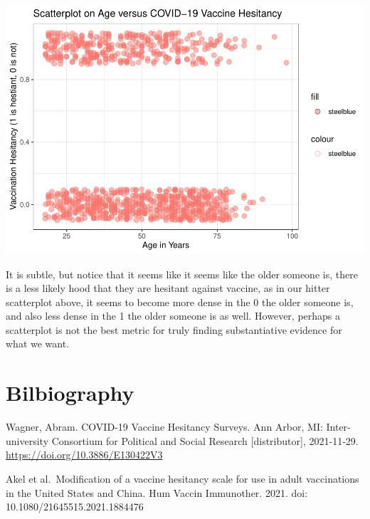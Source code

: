 \documentclass[
]{article}
\begin{document}
\includegraphics{final_project_part2_files/figure-latex/unnamed-chunk-4-1.pdf}

It is subtle, but notice that it seems like it seems like the older
someone is, there is a less likely hood that they are hesitant against
vaccine, as in our hitter scatterplot above, it seems to become more
dense in the 0 the older someone is, and also less dense in the 1 the
older someone is as well. However, perhaps a scatterplot is not the best
metric for truly finding substantiative evidence for what we want.

\hypertarget{bilbiography}{%
\section{Bilbiography}\label{bilbiography}}

Wagner, Abram. COVID-19 Vaccine Hesitancy Surveys. Ann Arbor, MI:
Inter-university Consortium for Political and Social Research
{[}distributor{]}, 2021-11-29. \url{https://doi.org/10.3886/E130422V3}

Akel et al.~Modification of a vaccine hesitancy scale for use in adult
vaccinations in the United States and China. Hum Vaccin Immunother.
2021. doi: 10.1080/21645515.2021.1884476
\end{document}
